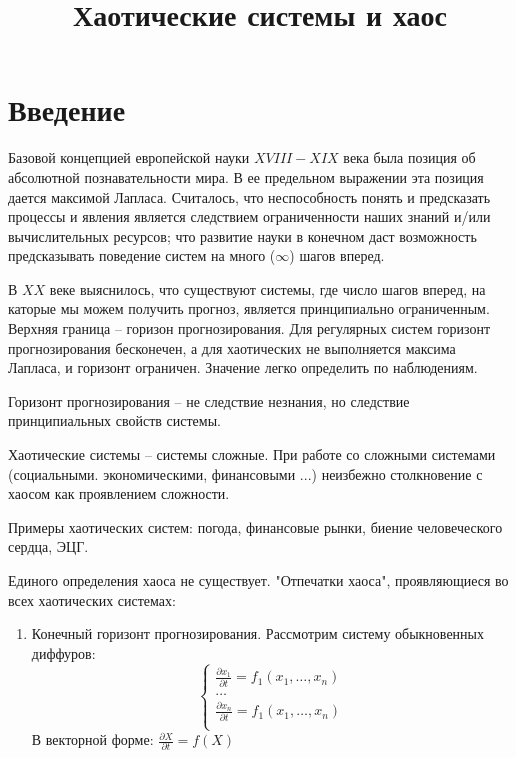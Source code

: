 \documentclass[11pt]{article}
\begin{document}
	\date{}
	\title{Хаотические системы и хаос}
	\maketitle
	
	\medskip
	\section{Введение}
	
	Базовой концепцией европейской науки $XVIII-XIX$ века была позиция об абсолютной познавательности мира. В ее предельном выражении эта позиция дается максимой Лапласа. Считалось, что неспособность понять и предсказать процессы и явления является следствием ограниченности наших знаний и/или вычислительных ресурсов; что развитие науки в конечном  даст возможность предсказывать поведение систем на много ($\infty$) шагов вперед.
	
	В $XX$ веке выяснилось, что существуют системы, где число шагов вперед, на каторые мы можем получить прогноз, является принципиально ограниченным. Верхняя граница -- горизон прогнозирования. Для регулярных систем горизонт прогнозирования бесконечен, а для хаотических не выполняется максима Лапласа, и горизонт ограничен. Значение легко определить по наблюдениям.
	
	Горизонт прогнозирования -- не следствие незнания, но следствие принципиальных свойств системы.
	
	Хаотические системы -- системы сложные. При работе со сложными системами (социальными. экономическими, финансовыми ...) неизбежно столкновение с хаосом как проявлением сложности.
	
	Примеры хаотических систем: погода, финансовые рынки, биение человеческого сердца, ЭЦГ.
	
	Единого определения хаоса не существует. "Отпечатки хаоса", проявляющиеся во всех хаотических системах: 
	\begin{enumerate}
		\item Конечный горизонт прогнозирования. Рассмотрим систему обыкновенных диффуров:
		$$\begin{cases}
			\frac{\partial x_1}{\partial t} = f_1 (x_1, \dots, x_n)\\
			\dots\\
			\frac{\partial x_n}{\partial t} = f_1 (x_1, \dots, x_n)\\
		\end{cases}$$
		В векторной форме: $\frac{\partial X}{\partial t} = f(X )$
	\end{enumerate}
\end{document}
